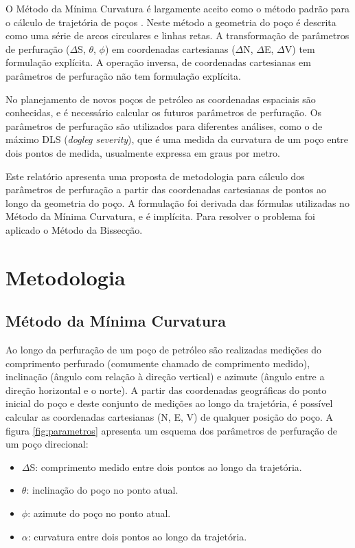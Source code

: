 \documentclass[final,3p,12pt]{elsarticle}
\begin{document}
O Método da Mínima Curvatura é largamente aceito como o método padrão para o cálculo de trajetória de poços \cite{10.2118/84246-MS}. Neste método a geometria do poço é descrita como uma série de arcos circulares e linhas retas. A transformação de parâmetros de perfuração ($\Delta$S, $\theta$, $\phi$) em coordenadas cartesianas ($\Delta$N, $\Delta$E, $\Delta$V) tem formulação explícita. A operação inversa, de coordenadas cartesianas em parâmetros de perfuração não tem formulação explícita.

No planejamento de novos poços de petróleo as coordenadas espaciais são conhecidas, e é necessário calcular os futuros parâmetros de perfuração. Os parâmetros de perfuração são utilizados para diferentes análises, como o de máximo DLS (\emph{dogleg severity}), que é uma medida da curvatura de um poço entre dois pontos de medida, usualmente expressa em graus por metro.

Este relatório apresenta uma proposta de metodologia para cálculo dos parâmetros de perfuração a partir das coordenadas cartesianas de pontos ao longo da geometria do poço. A formulação foi derivada das fórmulas utilizadas no Método da Mínima Curvatura, e é implícita. Para resolver o problema foi aplicado o Método da Bissecção.

\section{Metodologia}

\subsection{Método da Mínima Curvatura}

Ao longo da perfuração de um poço de petróleo são realizadas medições do comprimento perfurado (comumente chamado de comprimento medido), inclinação (ângulo com relação à direção vertical) e azimute (ângulo entre a direção horizontal e o norte). A partir das coordenadas geográficas do ponto inicial do poço e deste conjunto de medições ao longo da trajetória, é possível calcular as coordenadas cartesianas (N, E, V) de qualquer posição do poço. A figura \ref{fig:parametros} apresenta um esquema dos parâmetros de perfuração de um poço direcional:
\begin{itemize}
    \item $\Delta$S: comprimento medido entre dois pontos ao longo da trajetória.
    \item $\theta$: inclinação do poço no ponto atual.
    \item $\phi$: azimute do poço no ponto atual.
    \item $\alpha$: curvatura entre dois pontos ao longo da trajetória.
\end{itemize}
\end{document}
